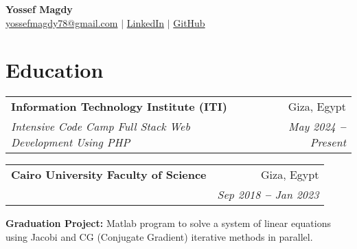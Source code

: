 \documentclass[a4paper,12pt]{article}
\makeatletter
\newcommand{\resumeSubheading}[4]{
  \vspace{-2pt}\item
    \begin{tabular*}{0.97\textwidth}[t]{l@{\extracolsep{\fill}}r}
      \textbf{#1} & #2 \\
      \textit{\small#3} & \textit{\small #4} \\
    \end{tabular*}\vspace{-7pt}
}
\newcommand{\resumeSubHeadingListStart}{\begin{itemize}[leftmargin=0.15in, label={}]}
\newcommand{\resumeSubHeadingListEnd}{\end{itemize}}
\makeatother
\begin{document}

\begin{center}
    \textbf{\Huge Yossef Magdy} \\ \vspace{3pt}
    \small
	\faEnvelope \hspace{.5pt} \href{mailto:yossefmagdy78@gmail.com}{yossefmagdy78@gmail.com}
   	$|$
	\faLinkedinSquare \hspace{.5pt} \href{https://www.linkedin.com/in/yossef-magdy}{LinkedIn}
    $|$
    \faGithub \hspace{.5pt} \href{https://github.com/yossef-magdy}{GitHub}
    
\end{center}




\section{Education}
  \vspace{3pt}
  \resumeSubHeadingListStart
    
    \resumeSubheading
	{Information Technology Institute (ITI)}{Giza, Egypt}
	{Intensive Code Camp Full Stack Web Development Using PHP }{May 2024 \textbf{--} Present}
    
    \resumeSubheading
    {Cairo University Faculty of Science}{Giza, Egypt}
    {B.Sc. in Computer Science   \textbf}{Sep 2018 \textbf{--} Jan 2023}
    \resumeSubHeadingListStart
    \small{
    	\item{
    	\textbf{Graduation Project:}
    		Matlab program to solve a system of linear equations using Jacobi and CG (Conjugate Gradient) iterative methods in parallel.
      	}
    }
    \resumeSubHeadingListEnd

    
  \resumeSubHeadingListEnd



\end{document}
